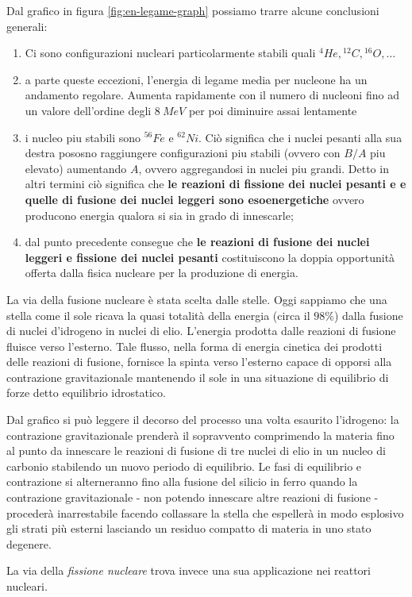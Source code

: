 Dal grafico in figura \ref{fig:en-legame-graph} possiamo trarre alcune conclusioni generali:
\begin{enumerate}
	\item Ci sono configurazioni nucleari particolarmente stabili quali ${}^{4}He, {}^{12}_{}C, {}^{16}_{}O, \dots$
	\item a parte queste eccezioni, l'energia di legame media per nucleone ha un andamento regolare.
	      Aumenta rapidamente con il numero di nucleoni fino ad un valore dell'ordine degli $8 \ MeV$ per poi diminuire assai lentamente
	\item i nucleo piu stabili sono ${}^{56}_{}Fe$ e ${}^{62}_{}Ni$.
	      Ciò significa che i nuclei pesanti alla sua destra pososno raggiungere configurazioni piu stabili (ovvero con $B / A$ piu elevato) aumentando $A$, ovvero aggregandosi in nuclei piu grandi.
	      Detto in altri termini ciò significa che \textbf{le reazioni di fissione dei nuclei pesanti e e quelle di fusione dei nuclei leggeri sono esoenergetiche} ovvero producono energia qualora si sia in grado di innescarle;
	\item dal punto precedente consegue che \textbf{le reazioni di fusione dei nuclei leggeri e fissione dei nuclei pesanti} costituiscono la doppia opportunità offerta dalla fisica nucleare per la produzione di energia.

\end{enumerate}

La via della fusione nucleare è stata scelta dalle stelle. Oggi sappiamo
che una stella come il sole ricava la quasi totalità della energia
(circa il \(98 \%\)) dalla fusione di nuclei d'idrogeno in nuclei di
elio.
L'energia prodotta dalle reazioni di fusione fluisce verso
l'esterno.
Tale flusso, nella forma di energia cinetica dei prodotti
delle reazioni di fusione, fornisce la spinta verso l'esterno capace di
opporsi alla contrazione gravitazionale mantenendo il sole in una
situazione di equilibrio di forze detto equilibrio idrostatico.

Dal grafico si può leggere il decorso del processo una volta esaurito
l'idrogeno: la contrazione gravitazionale prenderà il sopravvento
comprimendo la materia fino al punto da innescare le reazioni di fusione
di tre nuclei di elio in un nucleo di carbonio stabilendo un nuovo
periodo di equilibrio.
Le fasi di equilibrio e contrazione si
alterneranno fino alla fusione del silicio in ferro quando la
contrazione gravitazionale - non potendo innescare altre reazioni di
fusione - procederà inarrestabile facendo collassare la stella che
espellerà in modo esplosivo gli strati più esterni lasciando un residuo
compatto di materia in uno stato degenere.

La via della \emph{fissione nucleare} trova invece una sua applicazione
nei reattori nucleari.